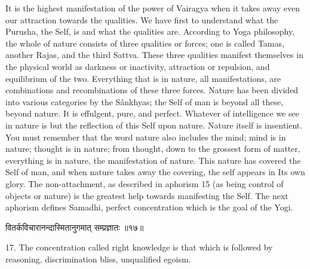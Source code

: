 It is the highest manifestation of the power of Vairagya when
it takes away even our attraction towards the qualities. We have first
to understand what the Purusha, the Self, is and what the qualities
are. According to Yoga philosophy, the whole of nature consists of
three qualities or forces; one is called Tamas, another Rajas, and the
third Sattva. These three qualities manifest themselves in the physical
world as darkness or inactivity, attraction or repulsion, and
equilibrium of the two. Everything that is in nature, all
manifestations, are combinations and recombinations of these three
forces. Nature has been divided
into various categories by the Sânkhyas; the Self of man is beyond all
these, beyond nature. It is effulgent, pure, and perfect. Whatever of
intelligence we see in nature is but the reflection of this Self upon
nature. Nature itself is insentient. You must remember that the word
nature also includes the mind; mind is in nature; thought is in nature;
from thought, down to the grossest form of matter, everything is in
nature, the manifestation of nature. This nature has covered the Self
of man, and when nature takes away the covering, the self appears in
Its own glory. The non-attachment, as described in aphorism 15 (as
being control of objects or nature) is the greatest help towards
manifesting the Self. The next aphorism defines Samadhi, perfect
concentration which is the goal of the Yogi. \\

\begin{center}
\begin{sanskrit}
वितर्कविचारानन्दास्मितानुगमात् सम्प्रज्ञातः
॥१७॥
\end{sanskrit}
\end{center}
17. The concentration called right knowledge is that which is
followed by reasoning, discrimination bliss, unqualified egoism. \\

